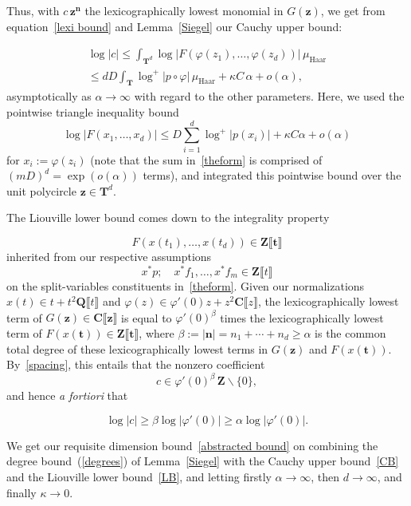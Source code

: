\documentclass[10pt]{amsart}
\renewcommand\setminus{\smallsetminus}
\def\T{\mathbf{T}}
\def\Z{\mathbf{Z}}
\def\Q{\mathbf{Q}}
\theoremstyle{remark}
\numberwithin{equation}{subsection}
\def\numequation{\addtocounter{subsubsection}{1}\begin{equation}}
\def\C{\mathbf{C}}
\begin{document}
Thus, with $c \, \mathbf{z^n}$ the lexicographically lowest monomial in $G(\mathbf{z})$, we get from equation~\eqref{lexi bound} and Lemma~\ref{Siegel} our Cauchy upper bound:
\numequation
\begin{split}
 \label{CB}
\log{|c|}   \leq \int_{\T^d} \log{|F(\varphi(z_1), \ldots, \varphi(z_d)) |} \, 
\mu_{\mathrm{Haar}} \\  
\leq  dD  \int_{\T} \log^+{|p \circ \varphi|}
\, \mu_{\mathrm{Haar}}  +  \kappa C \, \alpha + o(\alpha), 
\end{split}
\end{equation}
asymptotically as $\alpha \to \infty$ with regard to the other parameters. Here, we used the pointwise triangle inequality bound
$$
\log{|F(x_1,\ldots,x_d)|} \leq D \sum_{i=1}^d \log^+{|p(x_i)|}
+ \kappa C \alpha + o(\alpha)
$$
for $x_i := \varphi(z_i)$ (note that the sum in~\eqref{theform} is comprised 
of $(mD)^d = \exp(o(\alpha))$ terms), and integrated this pointwise bound over the unit polycircle $\mathbf{z} \in \T^d$. 

The Liouville lower bound comes down to  the integrality property 
\numequation        \label{spacing}
F(x(t_1), \ldots, x(t_d)) \in \Z\llbracket \mathbf{t} \rrbracket
\end{equation}
inherited from our respective assumptions
$$
x^*p; \quad x^* f_1, \ldots, x^* f_m \in \Z\llbracket t \rrbracket
$$
on the split-variables constituents in~\eqref{theform}. Given our normalizations $x(t) \in t + t^2 \Q\llbracket t \rrbracket$ and $\varphi(z)  \in \varphi'(0) z + z^2 \C \llbracket z \rrbracket$, the lexicographically lowest term of $G(\mathbf{z}) \in \C \llbracket \mathbf{z} \rrbracket$ is equal to $\varphi'(0)^{\beta}$ times the lexicographically lowest term of $F(x(\mathbf{t})) \in \Z\llbracket \mathbf{t} \rrbracket$, where $\beta := |\mathbf{n}| = n_1 + \cdots + n_d \geq \alpha$ is the common total degree of these lexicographically lowest terms in $G(\mathbf{z})$ and $F(x(\mathbf{t}))$. By~\eqref{spacing}, this entails that the nonzero coefficient
$$
c \in \varphi'(0)^{\beta} \, \Z \setminus \{0\},
$$
and hence {\it a fortiori} that
\numequation \label{LB}
\log{|c|} \geq \beta \log{|\varphi'(0)|} \geq \alpha \log{|\varphi'(0)|}.
\end{equation}



We get our requisite dimension bound~\eqref{abstracted bound} on combining the degree bound~(\ref{degrees}) of Lemma~\ref{Siegel} with the Cauchy upper bound~\eqref{CB} and the Liouville lower bound~\eqref{LB}, and letting firstly $\alpha \to \infty$, then $d \to \infty$, and finally $\kappa \to 0$. 
\end{document}

